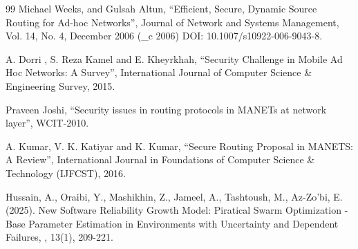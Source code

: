 \documentclass[10pt]{NSP1}
\begin{document}
\begin{thebibliography}{99}
Michael Weeks, and Gulsah Altun, “Efficient, Secure, Dynamic Source Routing for Ad-hoc Networks”, Journal of Network and Systems Management, Vol. 14, No. 4, December 2006 (\_c 2006) DOI: 10.1007/s10922-006-9043-8.

A. Dorri , S. Reza Kamel and E. Kheyrkhah, “Security Challenge in Mobile Ad Hoc Networks: A Survey”, International Journal of Computer Science \& Engineering Survey, 2015.

Praveen Joshi, “Security issues in routing protocols in MANETs at network layer”, WCIT-2010.

A. Kumar, V. K. Katiyar and K. Kumar, “Secure Routing Proposal in MANETS: A Review”, International Journal in Foundations of Computer Science \& Technology (IJFCST), 2016.

Hussain, A., Oraibi, Y., Mashikhin, Z., Jameel, A., Tashtoush, M., Az-Zo’bi, E. (2025). New Software Reliability Growth Model: Piratical Swarm Optimization -Base Parameter Estimation in Environments with Uncertainty and Dependent Failures, , 13(1), 209-221.

\end{thebibliography}
\end{document}

